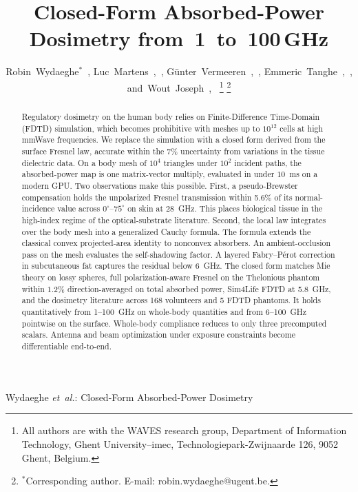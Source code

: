 \documentclass[journal,twocolumn,10pt]{IEEEtran}
\theoremstyle{plain}
\theoremstyle{remark}
\begin{document}
\title{Closed-Form Absorbed-Power Dosimetry from~1~to~100\,GHz}

\author{Robin~Wydaeghe$^{*}$~,
  Luc~Martens~,~,
  G\"unter~Vermeeren~,~,
  Emmeric~Tanghe~,~,
  and~Wout~Joseph~,~%
  \thanks{All authors are with the WAVES research group, Department of
  Information Technology, Ghent University--imec, Technologiepark-Zwijnaarde
  126, 9052 Ghent, Belgium.}%
  \thanks{$^{*}$Corresponding author. E-mail: robin.wydaeghe@ugent.be.}}

%
{Wydaeghe \MakeLowercase{\textit{et~al.}}: Closed-Form
Absorbed-Power Dosimetry}

\maketitle

\begin{abstract}
Regulatory dosimetry on the human body relies on Finite-Difference
Time-Domain (FDTD) simulation, which becomes prohibitive with meshes
up to $10^{12}$ cells at high mmWave frequencies.
We replace the simulation with a closed form derived from the
surface Fresnel law, accurate within the $7\%$ uncertainty from
variations in the tissue dielectric data. On a body mesh of $10^4$
triangles under $10^2$ incident paths, the absorbed-power map is one
matrix-vector multiply, evaluated in under $10$~ms on a modern GPU. Two observations make
this possible. First, a pseudo-Brewster compensation holds the
unpolarized Fresnel transmission within 5.6\% of its normal-incidence
value across $0^\circ$--$75^\circ$ on skin at 28~GHz. This places
biological tissue in the high-index regime of the optical-substrate
literature. Second, the local law integrates over the body mesh into
a generalized Cauchy formula. The formula extends the classical
convex projected-area identity to nonconvex absorbers. An
ambient-occlusion pass on the mesh evaluates the self-shadowing
factor. A layered Fabry--P\'erot correction in subcutaneous fat
captures the residual below 6~GHz. The closed form matches Mie theory
on lossy spheres, full polarization-aware Fresnel on the Thelonious
phantom within $1.2\%$ direction-averaged on total absorbed power,
Sim4Life FDTD at 5.8~GHz, and the dosimetry literature across 168
volunteers and 5 FDTD phantoms. It
holds quantitatively from 1--100~GHz on whole-body quantities and
from 6--100~GHz pointwise on the surface. Whole-body compliance
reduces to only three precomputed scalars.
Antenna and beam optimization under exposure constraints become
differentiable end-to-end.
\end{abstract}
\end{document}
